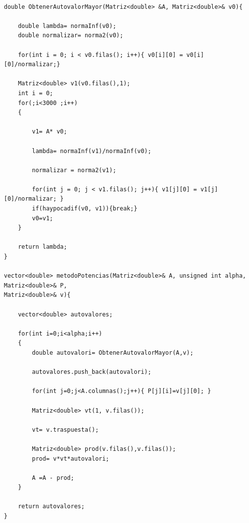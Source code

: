 \begin{verbatim}

double ObtenerAutovalorMayor(Matriz<double> &A, Matriz<double>& v0){

    double lambda= normaInf(v0);
    double normalizar= norma2(v0);

    for(int i = 0; i < v0.filas(); i++){ v0[i][0] = v0[i][0]/normalizar;}

    Matriz<double> v1(v0.filas(),1);
    int i = 0;
    for(;i<3000 ;i++)
    {

        v1= A* v0;

        lambda= normaInf(v1)/normaInf(v0);

        normalizar = norma2(v1);

        for(int j = 0; j < v1.filas(); j++){ v1[j][0] = v1[j][0]/normalizar; }
        if(haypocadif(v0, v1)){break;}
        v0=v1;
    }

    return lambda;
}

vector<double> metodoPotencias(Matriz<double>& A, unsigned int alpha, Matriz<double>& P, 
Matriz<double>& v){

    vector<double> autovalores;

    for(int i=0;i<alpha;i++)
    {
        double autovalori= ObtenerAutovalorMayor(A,v);

        autovalores.push_back(autovalori);

        for(int j=0;j<A.columnas();j++){ P[j][i]=v[j][0]; }

        Matriz<double> vt(1, v.filas());

        vt= v.traspuesta();

        Matriz<double> prod(v.filas(),v.filas());
        prod= v*vt*autovalori;

        A =A - prod;
    }

    return autovalores;
}





\end{verbatim}